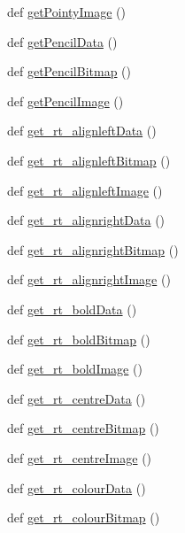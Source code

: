 \begin{DoxyCompactItemize}
def \hyperlink{namespaceimages_a38998e5e6aca706b4ea435db9d73ebcf}{get\+Pointy\+Image} ()
\item 
def \hyperlink{namespaceimages_a5d8df1140a3cfdc7bd201547c9bba93d}{get\+Pencil\+Data} ()
\item 
def \hyperlink{namespaceimages_ac5d1d4cd99b3fdfe8e4dd3d52b393aed}{get\+Pencil\+Bitmap} ()
\item 
def \hyperlink{namespaceimages_a695877c0a720a45d82a271c8fdeb1887}{get\+Pencil\+Image} ()
\item 
def \hyperlink{namespaceimages_aca3df35d167083df9d30d2d01cb284d9}{get\+\_\+rt\+\_\+alignleft\+Data} ()
\item 
def \hyperlink{namespaceimages_a0b99c798ef63b6b70e955821166a880e}{get\+\_\+rt\+\_\+alignleft\+Bitmap} ()
\item 
def \hyperlink{namespaceimages_ac5bb51ed178a2b8654577b5a450c2a95}{get\+\_\+rt\+\_\+alignleft\+Image} ()
\item 
def \hyperlink{namespaceimages_acf000e07da367236ad5320674525c7a5}{get\+\_\+rt\+\_\+alignright\+Data} ()
\item 
def \hyperlink{namespaceimages_a36985a57da68387cd9ab178b51b2a516}{get\+\_\+rt\+\_\+alignright\+Bitmap} ()
\item 
def \hyperlink{namespaceimages_a30f98db321746be49e7494a4468df4ea}{get\+\_\+rt\+\_\+alignright\+Image} ()
\item 
def \hyperlink{namespaceimages_a1cee3c739bbfc2c6dceb14468f703c75}{get\+\_\+rt\+\_\+bold\+Data} ()
\item 
def \hyperlink{namespaceimages_abc139a525ee8924fc0ec23529db44bc3}{get\+\_\+rt\+\_\+bold\+Bitmap} ()
\item 
def \hyperlink{namespaceimages_a8feaea0f04eb5f48edbdd759828ba0ee}{get\+\_\+rt\+\_\+bold\+Image} ()
\item 
def \hyperlink{namespaceimages_a80588d0b3c45479bb59dc2e48c1023f4}{get\+\_\+rt\+\_\+centre\+Data} ()
\item 
def \hyperlink{namespaceimages_a8ab9e3f1594f32159c320cfefd9438cc}{get\+\_\+rt\+\_\+centre\+Bitmap} ()
\item 
def \hyperlink{namespaceimages_ad0a504a5948c2d661187be424a907f77}{get\+\_\+rt\+\_\+centre\+Image} ()
\item 
def \hyperlink{namespaceimages_a8a0eb599a4907ce7cf32360e976a092f}{get\+\_\+rt\+\_\+colour\+Data} ()
\item 
def \hyperlink{namespaceimages_a1b30859f9da34672b1a80b985153cec1}{get\+\_\+rt\+\_\+colour\+Bitmap} ()
\item 

\end{DoxyCompactItemize}
